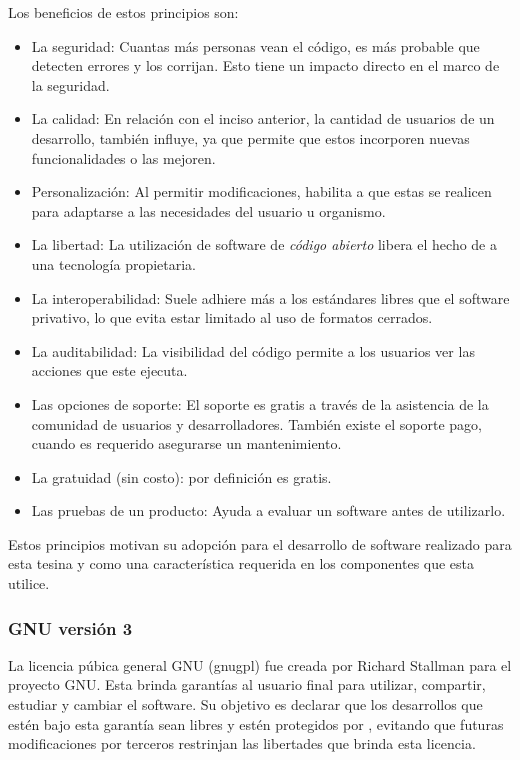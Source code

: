 Los beneficios de estos principios\cite{noyes2010openSourceGood} son:
\begin{itemize}
\item La seguridad: Cuantas más personas vean el código, es más probable que detecten errores y los corrijan. Esto tiene un impacto directo en el marco de la seguridad.
\item La calidad: En relación con el inciso anterior, la cantidad de usuarios de un desarrollo, también influye, ya que permite que estos incorporen nuevas funcionalidades o las mejoren.
\item Personalización: Al permitir modificaciones, habilita a que estas se realicen para adaptarse a las necesidades del usuario u organismo.
\item La libertad: La utilización de software de \textit{código abierto} libera el hecho de  a una tecnología propietaria.
\item La interoperabilidad: Suele adhiere más a los estándares libres que el software privativo, lo que evita estar limitado al uso de formatos cerrados.
\item La auditabilidad: La visibilidad del código permite a los usuarios ver las acciones que este ejecuta.
\item Las opciones de soporte: El soporte es gratis a través de la asistencia de la comunidad de usuarios y desarrolladores. También existe el soporte pago, cuando es requerido asegurarse un mantenimiento.
\item La gratuidad (sin costo): por definición es gratis.
\item Las pruebas de un producto: Ayuda a evaluar un software antes de utilizarlo.
\end{itemize}

Estos principios motivan su adopción para el desarrollo de software realizado para esta tesina y como una característica requerida en los componentes que esta utilice. 

\subsubsection{GNU  versión 3}
\label{gnu_gpl_v3}

La licencia púbica general GNU (\gls{gnugpl}) fue creada por Richard Stallman para el proyecto GNU. Esta brinda garantías al usuario final para utilizar, compartir, estudiar y cambiar el software. Su objetivo es declarar que los desarrollos que estén bajo esta garantía sean libres y estén protegidos por , evitando que futuras modificaciones por terceros restrinjan las libertades que brinda esta licencia.

